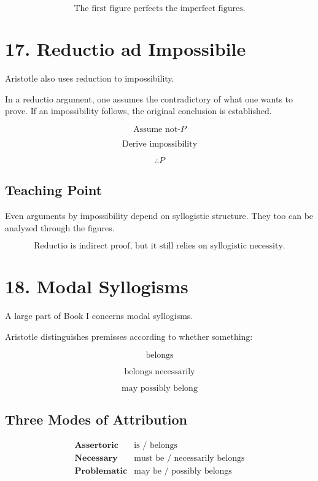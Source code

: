 \documentclass[12pt]{article}
\begin{document}
\[
\boxed{
\text{The first figure perfects the imperfect figures.}
}
\]

\section*{17. Reductio ad Impossibile}

Aristotle also uses reduction to impossibility.

In a reductio argument, one assumes the contradictory of what one wants to
prove. If an impossibility follows, the original conclusion is established.

\[
\text{Assume not-}P
\]

\[
\text{Derive impossibility}
\]

\[
\therefore P
\]

\subsection*{Teaching Point}

Even arguments by impossibility depend on syllogistic structure. They too can
be analyzed through the figures.

\[
\boxed{
\text{Reductio is indirect proof, but it still relies on syllogistic necessity.}
}
\]

\section*{18. Modal Syllogisms}

A large part of Book I concerns modal syllogisms.

Aristotle distinguishes premisses according to whether something:

\[
\text{belongs}
\]

\[
\text{belongs necessarily}
\]

\[
\text{may possibly belong}
\]

\subsection*{Three Modes of Attribution}

\[
\begin{array}{ll}
\textbf{Assertoric} & \text{is / belongs} \\
\textbf{Necessary} & \text{must be / necessarily belongs} \\
\textbf{Problematic} & \text{may be / possibly belongs}
\end{array}
\]
\end{document}
